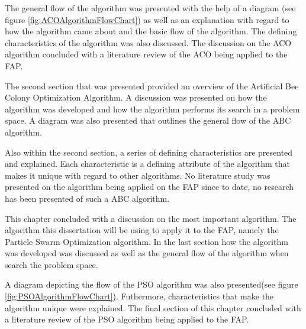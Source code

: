 The general flow of the algorithm was presented with the help of a diagram (see figure \ref{fig:ACOAlgorithmFlowChart}) as well as an explanation with regard to how the algorithm came about and the basic flow of the algorithm. The defining characteristics of the algorithm was also discussed. The discussion on the ACO algorithm concluded with a literature review of the ACO being applied to the FAP.

The second section that was presented provided an overview of the Artificial Bee Colony Optimization Algorithm. A discussion was presented on how the algorithm was developed and how the algorithm performs its search in a problem space. A diagram was also presented that outlines the general flow of the ABC algorithm.

Also within the second section, a series of defining characteristics are presented and explained. Each characteristic is a defining attribute of the algorithm that makes it unique with regard to other algorithms. No literature study was presented on the algorithm being applied on the FAP since to date, no research has been presented of such a ABC algorithm.

This chapter concluded with a discussion on the most important algorithm. The algorithm this dissertation will be using to apply it to the FAP, namely the Particle Swarm Optimization algorithm. In the last section how the algorithm was developed was discussed as well as the general flow of the algorithm when search the problem space.

A diagram depicting the flow of the PSO algorithm was also presented(see figure \ref{fig:PSOAlgorithmFlowChart}). Futhermore, characteristics that make the algorithm unique were explained. The final section of this chapter concluded with a literature review of the PSO algorithm being applied to the FAP.
